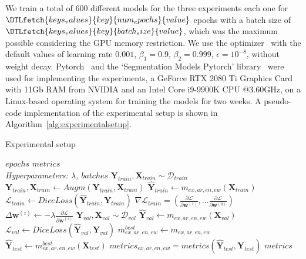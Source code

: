 \documentclass[journal]{IEEEtran}
\begin{document}
We train a total of $600$ different models for the three experiments each one for $\DTLfetch{keys_values}{key}{num_epochs}{value}$ epochs with a batch size of $\DTLfetch{keys_values}{key}{batch_size}{value}$, which was the maximum possible considering the GPU memory restriction.
We use the optimizer~\cite{kingma2014adam} with the default values of learning rate $0.001$, $\beta_1=0.9$, $\beta_2=0.999$, $\epsilon=10^{-8}$, without weight decay.
Pytorch~\cite{paszke2019pytorch} and the `Segmentation Models Pytorch' library~\cite{yakubovskiy2019segmentation} were used for implementing the experiments, a GeForce RTX 2080 Ti Graphics Card with 11Gb RAM from NVIDIA and an Intel Core i9-9900K CPU @3.60GHz, on a Linux-based operating system for training the models for two weeks.
A pseudo-code implementation of the experimental setup is shown in Algorithm~\ref{alg:experimentalsetup}.

\begin{algorithm}[H]
	\caption{Experimental setup}
	\label{alg:experimentalsetup}
	\begin{algorithmic}[1]
		\renewcommand{\algorithmicrequire}{\textbf{Input:}}
		\renewcommand{\algorithmicensure}{\textbf{Output:}}
		\REQUIRE $epochs$
		\ENSURE $metrics$
		\\ \textit{Hyperparameters:  $\lambda$, $batches$}
		\STATE $\bm{Y}_{train}, \bm{X}_{train} \sim \mathcal{D}_{train}$
		\STATE $\bm{Y}_{train}, \bm{X}_{train} \leftarrow Augm(\bm{Y}_{train}, \bm{X}_{train})$
		\STATE $\hat{\bm{Y}}_{train} \leftarrow m_{ex, ar, en, ew}(\bm{X}_{train})$
		\STATE $\mathcal{L}_{train} \leftarrow DiceLoss(\hat{\bm{Y}}_{train}, \bm{Y}_{train})$
		\STATE $\nabla\mathcal{L}_{train} = \left( \frac{\partial\mathcal{L}}{\partial\bm{w}^{(1)}},\ldots\frac{\partial\mathcal{L}}{\partial\bm{w}^{(q)}}\right)$
		\STATE $\Delta\bm{w}^{(i)} \leftarrow -\lambda\frac{\partial\mathcal{L}}{\partial\bm{w}^{(i)}}$
		\ENDFOR
		\STATE $\bm{Y}_{val}, \bm{X}_{val} \sim \mathcal{D}_{val}$
		\STATE $\hat{\bm{Y}}_{val} \leftarrow m_{ex, ar, en, ew}(\bm{X}_{val})$
		\STATE $\mathcal{L}_{val} \leftarrow DiceLoss(\hat{\bm{Y}}_{val}, \bm{Y}_{val})$
		\ENDFOR
		\STATE $m_{ex, ar, en, ew}^{best} \leftarrow m_{ex, ar, en, ew}$
		\ENDIF
		\ENDFOR
		\STATE $\hat{\bm{Y}}_{test} \leftarrow m_{ex, ar, en, ew}^{best}(\bm{X}_{test})$
		\STATE $metrics_{ex, ar, en, ew} = metrics(\hat{\bm{Y}}_{test}, \bm{Y}_{test})$
		\ENDFOR
		\ENDFOR
		\ENDFOR
		\ENDFOR
		\RETURN $metrics$
	\end{algorithmic}
\end{algorithm}
\end{document}
